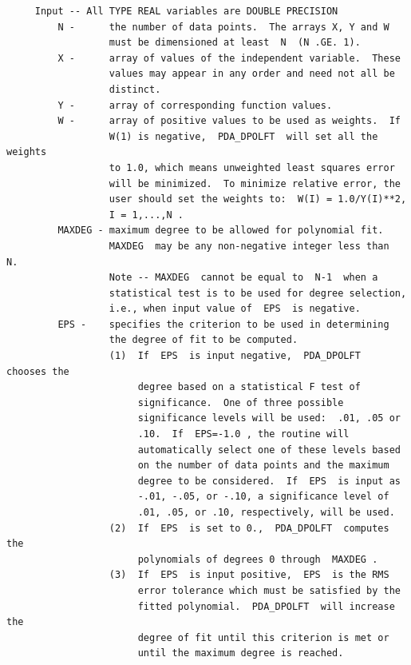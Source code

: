 \documentclass[11pt,twoside]{article}
\begin{document}
\begin{verbatim}
     Input -- All TYPE REAL variables are DOUBLE PRECISION
         N -      the number of data points.  The arrays X, Y and W
                  must be dimensioned at least  N  (N .GE. 1).
         X -      array of values of the independent variable.  These
                  values may appear in any order and need not all be
                  distinct.
         Y -      array of corresponding function values.
         W -      array of positive values to be used as weights.  If
                  W(1) is negative,  PDA_DPOLFT  will set all the weights
                  to 1.0, which means unweighted least squares error
                  will be minimized.  To minimize relative error, the
                  user should set the weights to:  W(I) = 1.0/Y(I)**2,
                  I = 1,...,N .
         MAXDEG - maximum degree to be allowed for polynomial fit.
                  MAXDEG  may be any non-negative integer less than  N.
                  Note -- MAXDEG  cannot be equal to  N-1  when a
                  statistical test is to be used for degree selection,
                  i.e., when input value of  EPS  is negative.
         EPS -    specifies the criterion to be used in determining
                  the degree of fit to be computed.
                  (1)  If  EPS  is input negative,  PDA_DPOLFT  chooses the
                       degree based on a statistical F test of
                       significance.  One of three possible
                       significance levels will be used:  .01, .05 or
                       .10.  If  EPS=-1.0 , the routine will
                       automatically select one of these levels based
                       on the number of data points and the maximum
                       degree to be considered.  If  EPS  is input as
                       -.01, -.05, or -.10, a significance level of
                       .01, .05, or .10, respectively, will be used.
                  (2)  If  EPS  is set to 0.,  PDA_DPOLFT  computes the
                       polynomials of degrees 0 through  MAXDEG .
                  (3)  If  EPS  is input positive,  EPS  is the RMS
                       error tolerance which must be satisfied by the
                       fitted polynomial.  PDA_DPOLFT  will increase the
                       degree of fit until this criterion is met or
                       until the maximum degree is reached.


\end{verbatim}
\end{document}
